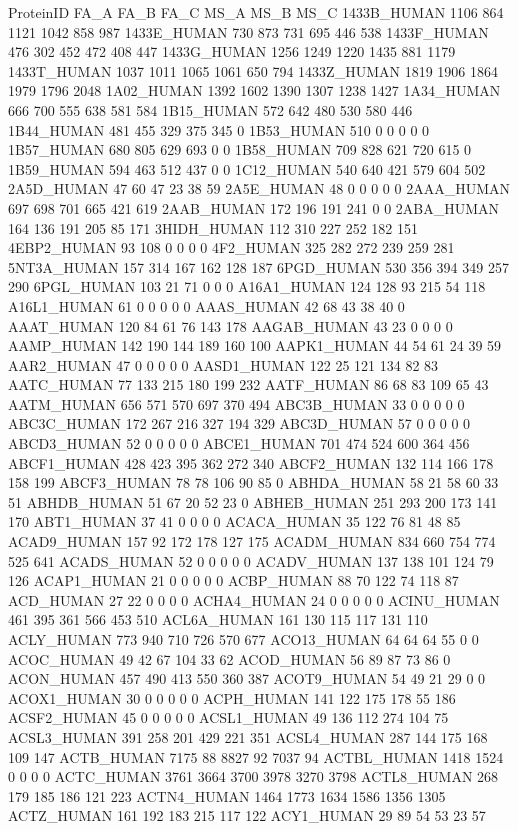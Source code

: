 ProteinID	FA_A	FA_B	FA_C	MS_A	MS_B	MS_C
1433B_HUMAN	1106	864	1121	1042	858	987
1433E_HUMAN	730	873	731	695	446	538
1433F_HUMAN	476	302	452	472	408	447
1433G_HUMAN	1256	1249	1220	1435	881	1179
1433T_HUMAN	1037	1011	1065	1061	650	794
1433Z_HUMAN	1819	1906	1864	1979	1796	2048
1A02_HUMAN	1392	1602	1390	1307	1238	1427
1A34_HUMAN	666	700	555	638	581	584
1B15_HUMAN	572	642	480	530	580	446
1B44_HUMAN	481	455	329	375	345	0
1B53_HUMAN	510	0	0	0	0	0
1B57_HUMAN	680	805	629	693	0	0
1B58_HUMAN	709	828	621	720	615	0
1B59_HUMAN	594	463	512	437	0	0
1C12_HUMAN	540	640	421	579	604	502
2A5D_HUMAN	47	60	47	23	38	59
2A5E_HUMAN	48	0	0	0	0	0
2AAA_HUMAN	697	698	701	665	421	619
2AAB_HUMAN	172	196	191	241	0	0
2ABA_HUMAN	164	136	191	205	85	171
3HIDH_HUMAN	112	310	227	252	182	151
4EBP2_HUMAN	93	108	0	0	0	0
4F2_HUMAN	325	282	272	239	259	281
5NT3A_HUMAN	157	314	167	162	128	187
6PGD_HUMAN	530	356	394	349	257	290
6PGL_HUMAN	103	21	71	0	0	0
A16A1_HUMAN	124	128	93	215	54	118
A16L1_HUMAN	61	0	0	0	0	0
AAAS_HUMAN	42	68	43	38	40	0
AAAT_HUMAN	120	84	61	76	143	178
AAGAB_HUMAN	43	23	0	0	0	0
AAMP_HUMAN	142	190	144	189	160	100
AAPK1_HUMAN	44	54	61	24	39	59
AAR2_HUMAN	47	0	0	0	0	0
AASD1_HUMAN	122	25	121	134	82	83
AATC_HUMAN	77	133	215	180	199	232
AATF_HUMAN	86	68	83	109	65	43
AATM_HUMAN	656	571	570	697	370	494
ABC3B_HUMAN	33	0	0	0	0	0
ABC3C_HUMAN	172	267	216	327	194	329
ABC3D_HUMAN	57	0	0	0	0	0
ABCD3_HUMAN	52	0	0	0	0	0
ABCE1_HUMAN	701	474	524	600	364	456
ABCF1_HUMAN	428	423	395	362	272	340
ABCF2_HUMAN	132	114	166	178	158	199
ABCF3_HUMAN	78	78	106	90	85	0
ABHDA_HUMAN	58	21	58	60	33	51
ABHDB_HUMAN	51	67	20	52	23	0
ABHEB_HUMAN	251	293	200	173	141	170
ABT1_HUMAN	37	41	0	0	0	0
ACACA_HUMAN	35	122	76	81	48	85
ACAD9_HUMAN	157	92	172	178	127	175
ACADM_HUMAN	834	660	754	774	525	641
ACADS_HUMAN	52	0	0	0	0	0
ACADV_HUMAN	137	138	101	124	79	126
ACAP1_HUMAN	21	0	0	0	0	0
ACBP_HUMAN	88	70	122	74	118	87
ACD_HUMAN	27	22	0	0	0	0
ACHA4_HUMAN	24	0	0	0	0	0
ACINU_HUMAN	461	395	361	566	453	510
ACL6A_HUMAN	161	130	115	117	131	110
ACLY_HUMAN	773	940	710	726	570	677
ACO13_HUMAN	64	64	64	55	0	0
ACOC_HUMAN	49	42	67	104	33	62
ACOD_HUMAN	56	89	87	73	86	0
ACON_HUMAN	457	490	413	550	360	387
ACOT9_HUMAN	54	49	21	29	0	0
ACOX1_HUMAN	30	0	0	0	0	0
ACPH_HUMAN	141	122	175	178	55	186
ACSF2_HUMAN	45	0	0	0	0	0
ACSL1_HUMAN	49	136	112	274	104	75
ACSL3_HUMAN	391	258	201	429	221	351
ACSL4_HUMAN	287	144	175	168	109	147
ACTB_HUMAN	7175	88	8827	92	7037	94
ACTBL_HUMAN	1418	1524	0	0	0	0
ACTC_HUMAN	3761	3664	3700	3978	3270	3798
ACTL8_HUMAN	268	179	185	186	121	223
ACTN4_HUMAN	1464	1773	1634	1586	1356	1305
ACTZ_HUMAN	161	192	183	215	117	122
ACY1_HUMAN	29	89	54	53	23	57
